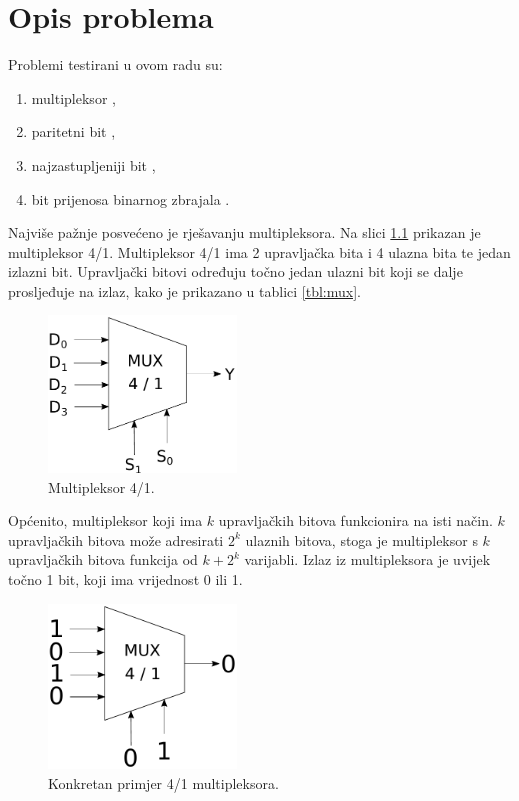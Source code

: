 \documentclass[times, utf8, zavrsni]{fer}
\begin{document}
\chapter{Opis problema} \label{ch:prob}
Problemi testirani u ovom radu su:
\begin{enumerate}
    \item multipleksor ,
    \item paritetni bit ,
    \item najzastupljeniji bit ,
    \item bit prijenosa binarnog zbrajala .
\end{enumerate}

Najviše pažnje posvećeno je rješavanju multipleksora.
Na slici \ref{img:mux} prikazan je multipleksor 4/1.
Multipleksor 4/1 ima 2 upravljačka bita i 4 ulazna bita te jedan izlazni bit.
Upravljački bitovi određuju točno jedan ulazni bit koji se dalje prosljeđuje na izlaz, kako je prikazano u tablici \ref{tbl:mux}.
\begin{figure}[h]
    \centering
    \includegraphics[width=5cm]{img/mux.pdf}
    \caption{Multipleksor 4/1.}
    \label{img:mux}
\end{figure}
Općenito, multipleksor koji ima $k$ upravljačkih bitova funkcionira na isti način.
$k$ upravljačkih bitova može adresirati $2^{k}$ ulaznih bitova, stoga je multipleksor s $k$ upravljačkih bitova funkcija od $k + 2^{k}$ varijabli.
Izlaz iz multipleksora je uvijek točno 1 bit, koji ima vrijednost 0 ili 1.
\begin{figure}[h]
    \centering
    \includegraphics[width=5cm]{img/muxex.pdf}
    \caption{Konkretan primjer 4/1 multipleksora.}
    \label{img:muxex}
\end{figure}
\end{document}
